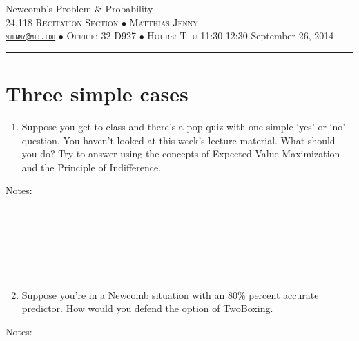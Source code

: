 \documentclass[justified]{tufte-handout}
\newcommand{\HRule}{\rule{\linewidth}{0.1mm}}
\begin{document}
\begin{fullwidth}
\noindent\LARGE Newcomb's Problem \& Probability \normalsize \\[.3cm]
\noindent  \textsc{24.118 Recitation Section $\bullet$ Matthias Jenny\\  {\texttt{\href{mailto:mjenny@mit.edu}{mjenny@mit.edu}}} $\bullet$ Office:  32-D927 $\bullet$ Hours: Thu 11:30-12:30} \hfill{September 26, 2014}
\noindent\HRule
\end{fullwidth}

\section{Three simple cases}

\begin{enumerate}
\item Suppose you get to class and there's a pop quiz with one simple `yes' or `no' question. You haven't looked at this week's lecture material. What should you do? Try to answer using the concepts of Expected Value Maximization and the Principle of Indifference.\end{enumerate}

\noindent Notes:  \underline{\hspace{15.75cm}}\\\\\underline{\hspace{16.88cm}}\\\\\underline{\hspace{16.88cm}}\\\\\underline{\hspace{16.88cm}}\\

\begin{enumerate}
\setcounter{enumi}{1}
\item Suppose you're in a Newcomb situation with an 80\% percent accurate predictor. How would you defend the option of TwoBoxing.
\end{enumerate}

\noindent Notes:  \underline{\hspace{15.75cm}}\\\\\underline{\hspace{16.88cm}}\\\\\underline{\hspace{16.88cm}}\\\\\underline{\hspace{16.88cm}}\\
\end{document}
